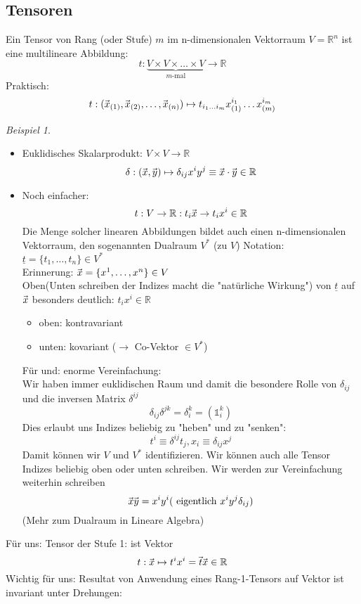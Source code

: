 \documentclass[a4paper]{scrartcl}
\renewcommand{\v}[1]{\mathrlap{\vec{\mkern-2mu\phantom{#1}}}#1}
\theoremstyle{definition}
\theoremstyle{plain}
\theoremstyle{remark}
\theoremstyle{remark}
\newtheorem{ex}{Beispiel}
\newcommand{\ubar}[1]{\underline{#1}}
\begin{document}
\subsection{Tensoren}
\label{sec-6-4}
Ein Tensor von Rang (oder Stufe) $m$ im n-dimensionalen Vektorraum $V = \mathbb{R}^n$ ist eine multilineare Abbildung:
\[t:\underbrace{V\times V\times \ldots \times V}_{m\text{-mal}} \to \mathbb{R}\]
Praktisch:
\[t: (\v x_{(1)}, \v x_{(2)}, \ldots, \v x_{(n)}) \mapsto t_{i_1 \ldots i_m} x_{(1)}^{i_1} \ldots x_{(m)}^{i_m} \]
\begin{ex}
\begin{itemize}
\item Euklidisches Skalarprodukt: $V\times V \to \mathbb{R}$
         \[\delta: (\v x, \v y) \mapsto \delta_{ij} x^i y^j \equiv \v x \cdot \v y \in \mathbb{R}\]
\item Noch einfacher:
\[t: V \to \mathbb{R}: t_i \v x \to t_i x^i \in \mathbb{R}\]
Die Menge solcher linearen Abbildungen bildet auch einen n-dimensionalen Vektorraum, den sogenannten Dualraum $V^\ast$ (zu $V$)
Notation: $\ubar t = \{t_1, \ldots, t_n\} \in V^\ast$ \\
         Erinnerung: $\v x = \{x^1, \ldots, x^n\} \in V$ \\
         Oben(Unten schreiben der Indizes macht die "natürliche Wirkung") von $\ubar t$ auf $\v x$ besonders deutlich: $t_i x^i \in \mathbb{R}$
\begin{itemize}
\item oben: kontravariant
\item unten: kovariant ($\rightarrow$ Co-Vektor $\in V^\ast$)
\end{itemize}
Für und: enorme Vereinfachung: \\
         Wir haben immer euklidischen Raum und damit die besondere Rolle von $\delta_{ij}$ und die inversen Matrix $\delta^{ij}$
\[\delta_{ij} \delta^{jk} = \delta_i^k = (\mathbb{1}_i^k)\]
Dies erlaubt uns Indizes beliebig zu "heben" und zu "senken":
\[t^i \equiv \delta^{ij} t_j, x_i \equiv \delta_{ij}x^j\]
Damit können wir $V$ und $V^\ast$ identifizieren. Wir können auch alle Tensor Indizes beliebig oben oder unten schreiben.
Wir werden zur Vereinfachung weiterhin schreiben
\[\v x \v y = x^i y^i (~\text{eigentlich}~x^i y^j \delta_{ij})\]
(Mehr zum Dualraum in Lineare Algebra)
\end{itemize}
\end{ex}
Für uns: Tensor der Stufe 1: ist Vektor
\[t: \v x \mapsto t^i x^i = \v t \v x \in \mathbb{R}\]
Wichtig für uns: Resultat von Anwendung eines Rang-1-Tensors auf Vektor ist invariant unter Drehungen:
\end{document}
